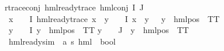 \begin{isabellebody}
r{\isacharunderscore}{\kern0pt}trace{\isacharunderscore}{\kern0pt}conj{\isacharcolon}{\kern0pt}\ {\isachardoublequoteopen}hml{\isacharunderscore}{\kern0pt}ready{\isacharunderscore}{\kern0pt}trace\ {\isacharparenleft}{\kern0pt}hml{\isacharunderscore}{\kern0pt}conj\ I\ J\ {\isasymPhi}{\isacharparenright}{\kern0pt}{\isachardoublequoteclose}\ \isanewline
{}\ {\isachardoublequoteopen}{\isacharparenleft}{\kern0pt}{\isasymexists}x\ {\isasymin}\ {\isacharparenleft}{\kern0pt}{\isasymPhi}\ {\isacharbackquote}{\kern0pt}\ I{\isacharparenright}{\kern0pt}{\isachardot}{\kern0pt}\ hml{\isacharunderscore}{\kern0pt}ready{\isacharunderscore}{\kern0pt}trace\ x\ {\isasymand}\ {\isacharparenleft}{\kern0pt}{\isasymforall}y\ {\isasymin}\ {\isacharparenleft}{\kern0pt}{\isasymPhi}\ {\isacharbackquote}{\kern0pt}\ I{\isacharparenright}{\kern0pt}{\isachardot}{\kern0pt}\ x\ {\isasymnoteq}\ y\ {\isasymlongrightarrow}\ {\isacharparenleft}{\kern0pt}{\isasymexists}{\isasymalpha}{\isachardot}{\kern0pt}\ y\ {\isacharequal}{\kern0pt}\ {\isacharparenleft}{\kern0pt}hml{\isacharunderscore}{\kern0pt}pos\ {\isasymalpha}\ TT{\isacharparenright}{\kern0pt}{\isacharparenright}{\kern0pt}{\isacharparenright}{\kern0pt}{\isacharparenright}{\kern0pt}\isanewline
{\isasymor}\ {\isacharparenleft}{\kern0pt}{\isasymforall}y\ {\isasymin}\ {\isacharparenleft}{\kern0pt}{\isasymPhi}\ {\isacharbackquote}{\kern0pt}\ I{\isacharparenright}{\kern0pt}{\isachardot}{\kern0pt}{\isacharparenleft}{\kern0pt}{\isasymexists}{\isasymalpha}{\isachardot}{\kern0pt}\ y\ {\isacharequal}{\kern0pt}\ {\isacharparenleft}{\kern0pt}hml{\isacharunderscore}{\kern0pt}pos\ {\isasymalpha}\ TT{\isacharparenright}{\kern0pt}{\isacharparenright}{\kern0pt}{\isacharparenright}{\kern0pt}{\isachardoublequoteclose}\isanewline
{\isachardoublequoteopen}{\isacharparenleft}{\kern0pt}{\isasymforall}y\ {\isasymin}\ {\isacharparenleft}{\kern0pt}{\isasymPhi}\ {\isacharbackquote}{\kern0pt}\ J{\isacharparenright}{\kern0pt}{\isachardot}{\kern0pt}\ {\isacharparenleft}{\kern0pt}{\isasymexists}{\isasymalpha}{\isachardot}{\kern0pt}\ y\ {\isacharequal}{\kern0pt}\ {\isacharparenleft}{\kern0pt}hml{\isacharunderscore}{\kern0pt}pos\ {\isasymalpha}\ TT{\isacharparenright}{\kern0pt}{\isacharparenright}{\kern0pt}{\isacharparenright}{\kern0pt}{\isachardoublequoteclose}\isanewline
\isanewline
{}\isamarkupfalse%
\ hml{\isacharunderscore}{\kern0pt}ready{\isacharunderscore}{\kern0pt}sim\ {\isacharcolon}{\kern0pt}{\isacharcolon}{\kern0pt}\ {\isachardoublequoteopen}{\isacharparenleft}{\kern0pt}{\isacharprime}{\kern0pt}a{\isacharcomma}{\kern0pt}\ {\isacharprime}{\kern0pt}s{\isacharparenright}{\kern0pt}\ hml\ {\isasymRightarrow}\ bool{\isachardoublequoteclose}\isanewline

\end{isabellebody}
